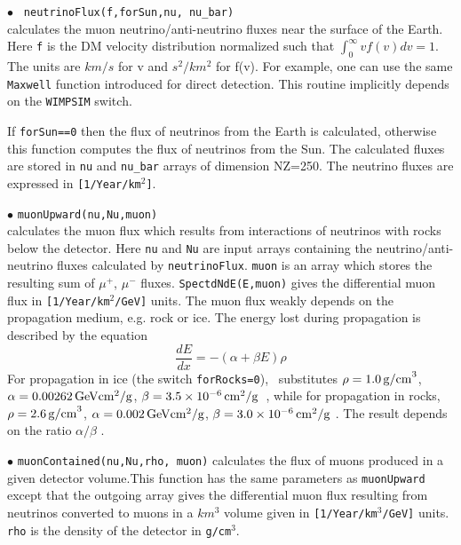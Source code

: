 \documentclass[12pt,a4paper]{article}
\begin{document}
  
\noindent
$\bullet$ \verb| neutrinoFlux(f,forSun,nu, nu_bar)|\\
calculates the muon neutrino/anti-neutrino  fluxes  near the surface of the Earth. 
Here  \verb|f|  is  the DM velocity distribution   normalized such that 
$ \int_0^{\infty} v f(v) dv =1$. The units  are $km/s$ for v and $s^2/km^2$ for  
f(v).  For example,   one can use the same  \verb|Maxwell| 
function introduced for direct detection.  This routine implicitly depends on the {\tt WIMPSIM} switch.
  
  If {\tt forSun==0} then the flux of neutrinos from the Earth is calculated, otherwise this function computes the flux of neutrinos from the Sun.  The calculated fluxes are stored in {\tt nu} and {\tt nu\_bar}  arrays of dimension NZ=250.  
The neutrino fluxes are expressed in \verb|[1/Year/km|$^2$\verb|]|.

\noindent
$\bullet$ \verb|muonUpward(nu,Nu,muon)|\\
calculates the muon flux which results from interactions of
neutrinos with rocks below the detector. Here  {\tt nu} and {\tt Nu} are input arrays containing the
neutrino/anti-neutrino fluxes calculated by {\tt neutrinoFlux}. {\tt muon} is an
array which stores the resulting sum of $\mu^+$, $\mu^-$ fluxes. {\tt SpectdNdE(E,muon)}  gives the
differential muon flux  in \verb|[1/Year/km|$^2$\verb|/GeV]| units.  
The muon flux weakly depends on the propagation medium, e.g. rock or ice. The energy lost during
propagation is described by  the equation  \cite{Erkoca:2009by}
\begin{equation}
\frac{dE}{dx}=-(\alpha +\beta E)\rho 
\end{equation}
For propagation in ice (the switch {\tt forRocks=0}),
 \micro\ substitutes 
$\rho= 1.0{\rm \, g/cm}^3$, $\alpha=0.00262 {\rm \, GeV} {\rm cm}^2/{\rm g}$,  $\beta=3.5\times 10^{-6} {\rm \, cm}^2/{\rm g}$~\cite{Chirkin:2004hz}, while
for propagation in rocks, 
$\rho= 2.6{\rm \, g/cm}^3$, $\alpha=0.002 {\rm \, GeV} {\rm cm}^2/{\rm g}$,  $\beta=3.0\times 10^{-6} {\rm \, cm}^2/{\rm g}$ \cite{Erkoca:2009by}. 
The result depends on the ratio $\alpha/\beta$ .

\noindent $\bullet$ \verb|muonContained(nu,Nu,rho, muon)|
calculates  the flux  of muons  produced in a given detector volume.This function  has the same parameters as \verb|muonUpward| 
except that the  outgoing  array gives the differential muon flux resulting from neutrinos converted to muons 
in a  $km^3$ volume given  in \verb|[1/Year/km|$^3$\verb|/GeV]| units.  \verb|rho| is the density of the detector in 
\verb|g/cm|$^3$.\\
\end{document}
